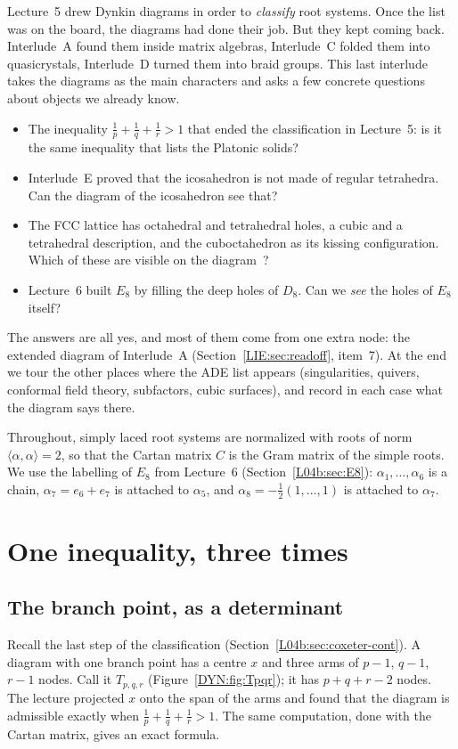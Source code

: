 \documentclass[11pt,openany]{book}
\theoremstyle{plain}
\theoremstyle{definition}
\theoremstyle{remark}
\newcommand{\ip}[2]{\langle #1, #2\rangle}
\begin{document}
Lecture~5 drew Dynkin diagrams in order to \emph{classify} root systems. Once the list was on the
board, the diagrams had done their job. But they kept coming back. Interlude~A found them inside
matrix algebras, Interlude~C folded them into quasicrystals, Interlude~D turned them into braid groups.
This last interlude takes the diagrams as the main characters and asks a few concrete questions about
objects we already know.
\begin{itemize}[nosep]
\item The inequality $\frac1p+\frac1q+\frac1r>1$ that ended the classification in Lecture~5: is it the
  same inequality that lists the Platonic solids?
\item Interlude~E proved that the icosahedron is not made of regular tetrahedra. Can the diagram of
  the icosahedron see that?
\item The FCC lattice has octahedral and tetrahedral holes, a cubic and a tetrahedral description,
  and the cuboctahedron as its kissing configuration. Which of these are visible on the diagram
  \,?
\item Lecture~6 built $E_8$ by filling the deep holes of $D_8$. Can we \emph{see} the holes of $E_8$
  itself?
\end{itemize}
The answers are all yes, and most of them come from one extra node: the extended diagram of
Interlude~A (Section~\ref{LIE:sec:readoff}, item~7). At the end we tour the other places where the
ADE list appears (singularities, quivers, conformal field theory, subfactors, cubic surfaces), and
record in each case what the diagram says there.

Throughout, simply laced root systems are normalized with roots of norm $\ip\alpha\alpha=2$, so that
the Cartan matrix $C$ is the Gram matrix of the simple roots. We use the labelling of $E_8$ from
Lecture~6 (Section~\ref{L04b:sec:E8}): $\alpha_1,\dots,\alpha_6$ is a chain, $\alpha_7=e_6+e_7$ is
attached to $\alpha_5$, and $\alpha_8=-\frac12(1,\dots,1)$ is attached to $\alpha_7$.

\section{One inequality, three times}
\label{DYN:sec:pqr}

\subsection*{The branch point, as a determinant}
Recall the last step of the classification (Section~\ref{L04b:sec:coxeter-cont}). A diagram with one
branch point has a centre $x$ and three arms of $p-1$, $q-1$, $r-1$ nodes. Call it $T_{p,q,r}$
(Figure~\ref{DYN:fig:Tpqr}); it has $p+q+r-2$ nodes. The lecture projected $x$ onto the span of the
arms and found that the diagram is admissible exactly when
$\frac1p+\frac1q+\frac1r>1$. The same computation, done with the Cartan matrix, gives an exact formula.
\end{document}
